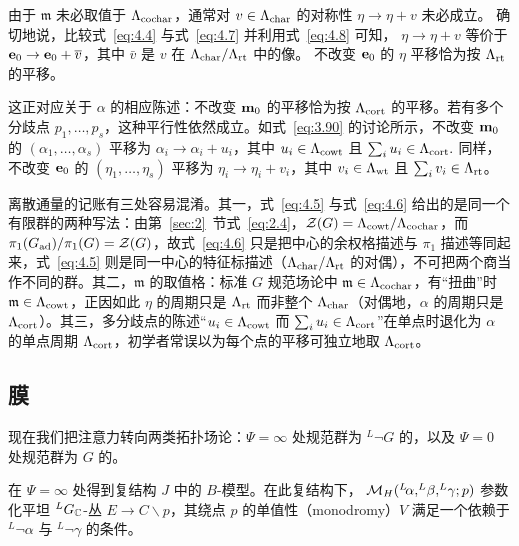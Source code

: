 由于 $\mathfrak{m}$ 未必取值于 $\Lambda_{\rm cochar}$，通常对 $v\in \Lambda_{\rm char}$ 的对称性 $\eta\to\eta+v$ 未必成立。
确切地说，比较式~\eqref{eq:4.4} 与式~\eqref{eq:4.7} 并利用式~\eqref{eq:4.8} 可知，
$\eta\to \eta+v$ 等价于 ${\bf e}_0\to {\bf e}_0+\bar v$，其中
$\bar v$ 是 $v$ 在 $\Lambda_{\rm char}/\Lambda_{\rm rt}$ 中的像。
不改变 ${\bf e}_0$ 的 $\eta$ 平移恰为按 $\Lambda_{\rm rt}$ 的平移。

这正对应关于 $\alpha$ 的相应陈述：不改变 ${\bf m}_0$ 的平移恰为按 $\Lambda_{\rm cort}$ 的平移。若有多个分歧点
$p_1,\dots,p_s$，这种平行性依然成立。如式~\eqref{eq:3.90} 的讨论所示，不改变 ${\bf m}_0$ 的
$(\alpha_1,\dots,\alpha_s)$ 平移为 $\alpha_i\to\alpha_i+u_i$，其中
$u_i\in \Lambda_{\cowt}$ 且 $\sum_i u_i\in \Lambda_\cort.$
同样，不改变 ${\bf e}_0$ 的 $(\eta_1,\dots,\eta_s)$ 平移为 $\eta_i\to \eta_i+v_i$，其中 $v_i\in \Lambda_\wt$
且 $\sum_iv_i\in \Lambda_\rt$。

\begin{yizhu}[易错点]
离散通量的记账有三处容易混淆。其一，式~\eqref{eq:4.5} 与式~\eqref{eq:4.6} 给出的是同一个有限群的两种写法：由第~\ref{sec:2}~节式~\eqref{eq:2.4}，${\mathcal Z}(G)=\Lambda_{\rm cowt}/\Lambda_{\rm cochar}$，而 $\pi_1(G_{\rm ad})/\pi_1(G)={\mathcal Z}(G)$，故式~\eqref{eq:4.6} 只是把中心的余权格描述与 $\pi_1$ 描述等同起来，式~\eqref{eq:4.5} 则是同一中心的特征标描述（$\Lambda_{\rm char}/\Lambda_{\rm rt}$ 的对偶），不可把两个商当作不同的群。其二，$\mathfrak{m}$ 的取值格：标准 $G$ 规范场论中 $\mathfrak{m}\in\Lambda_{\rm cochar}$，有“扭曲”时 $\mathfrak{m}\in\Lambda_{\rm cowt}$，正因如此 $\eta$ 的周期只是 $\Lambda_{\rm rt}$ 而非整个 $\Lambda_{\rm char}$（对偶地，$\alpha$ 的周期只是 $\Lambda_{\rm cort}$）。其三，多分歧点的陈述“$u_i\in\Lambda_{\rm cowt}$ 而 $\sum_i u_i\in\Lambda_{\rm cort}$”在单点时退化为 $\alpha$ 的单点周期 $\Lambda_{\rm cort}$，初学者常误以为每个点的平移可独立地取 $\Lambda_{\rm cort}$。
\end{yizhu}


\subsection{膜}

\label{sec:4.3}

现在我们把注意力转向两类拓扑场论：$\Psi=\infty$ 处规范群为 $^L\neg G$ 的，以及 $\Psi=0$ 处规范群为 $G$ 的。

在 $\Psi=\infty$ 处得到复结构 $J$ 中的 $B$-模型。在此复结构下，
$\MH(^L\neg\alpha,^L\neg\beta,^L\neg\gamma;p)$ 参数化平坦
$^LG_\C$-丛 $E\to C\backslash p$，其绕点 $p$ 的单值性（monodromy）$V$ 满足一个依赖于 $^L\neg\alpha$ 与
$^L\neg\gamma$ 的条件。

